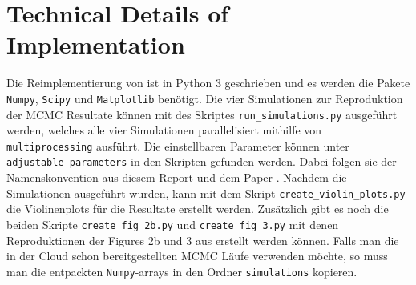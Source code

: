 \documentclass{scrartcl}
\begin{document}
    \section{Technical Details of Implementation}
    Die Reimplementierung von \cite{lau2019} ist in Python 3 geschrieben und es werden die Pakete \texttt{Numpy}, \texttt{Scipy}
    und \texttt{Matplotlib} benötigt. Die vier Simulationen zur Reproduktion der MCMC Resultate können mit des Skriptes
    \texttt{run\_simulations.py} ausgeführt werden, welches alle vier Simulationen parallelisiert mithilfe von \texttt{multiprocessing} ausführt.
    Die einstellbaren Parameter können unter \texttt{adjustable parameters} in den Skripten gefunden werden. Dabei folgen sie der Namenskonvention aus diesem Report
    und dem Paper \cite{lau2019}. Nachdem die Simulationen ausgeführt wurden, kann mit dem Skript \texttt{create\_violin\_plots.py}
    die Violinenplots für die Resultate erstellt werden. Zusätzlich gibt es noch die beiden Skripte \texttt{create\_fig\_2b.py}
    und \texttt{create\_fig\_3.py} mit denen Reproduktionen der Figures 2b und 3 aus \cite{lau2019} erstellt werden können.
    Falls man die in der Cloud schon bereitgestellten MCMC Läufe verwenden möchte, so muss man die entpackten \texttt{Numpy}-arrays in den Ordner
    \texttt{simulations} kopieren.

    
    
\end{document}
